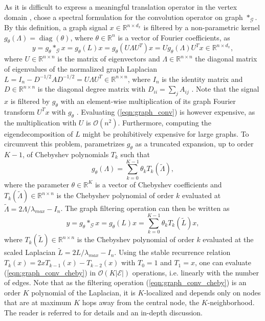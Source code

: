 \documentclass{article} %
\DeclareMathOperator*{\diag}{diag}
\newcommand{\R}{\mathbb{R}}
\newcommand{\bO}{\mathcal{O}}
\newcommand{\G}{\mathcal{G}}
\newcommand{\E}{\mathcal{E}}
\newcommand{\eqnref}[1]{(\ref{eqn:#1})}
\begin{document}
As it is difficult to express a meaningful translation operator in the vertex
domain \citep{gcnn_bruna, gcnn_niepert}, \citet{gcnn} chose a spectral
formulation for the convolution operator on graph $\ast_\G$. By this
definition, a graph signal $x \in \R^{n \times d_x}$ is filtered by a non-parametric kernel
$g_\theta(\Lambda) = \diag(\theta)$, where $\theta \in \R^n$ is a vector of
Fourier coefficients, as
\begin{equation} \label{eqn:graph_conv}
	y = g_\theta \ast_\G x = g_\theta(L) x =
	g_\theta(U \Lambda U^T) x = U g_\theta(\Lambda) U^T x \in \R^{n \times d_x},
\end{equation}
where $U \in \R^{n \times n}$ is the matrix of eigenvectors and $\Lambda \in
\R^{n \times n}$ the diagonal matrix of eigenvalues of the normalized graph
Laplacian $L = I_n - D^{-1/2} A D^{-1/2} = U \Lambda U^T \in \R^{n \times n}$,
where $I_n$ is the identity matrix and $D \in \R^{n \times n}$ is the diagonal
degree matrix with $D_{ii} = \sum_j A_{ij}$ \citep{chung}.  Note that the
signal $x$ is filtered by $g_\theta$ with an element-wise multiplication of its
graph Fourier transform $U^T x$ with $g_\theta$ \citep{gsp}. Evaluating
\eqnref{graph_conv} is however expensive, as the multiplication with $U$ is
$\bO(n^2)$. Furthermore, computing the eigendecomposition of $L$ might be
prohibitively expensive for large graphs. To circumvent this problem,
\cite{gcnn} parametrizes $g_\theta$ as a truncated expansion, up to order
$K-1$, of Chebyshev polynomials $T_k$ such that
\begin{equation} \label{eqn:filt_cheby}
	g_\theta(\Lambda) = \sum_{k=0}^{K-1} \theta_k T_k(\tilde{\Lambda}),
\end{equation}
where the parameter $\theta \in \R^K$ is a vector of Chebyshev coefficients and
$T_k(\tilde{\Lambda}) \in \R^{n \times n}$ is the Chebyshev polynomial of order
$k$ evaluated at $\tilde{\Lambda} = 2 \Lambda / \lambda_{max} - I_n$. The
graph filtering operation can then be written as
\begin{equation} \label{eqn:graph_conv_cheby}
	y = g_\theta \ast_\G x = g_\theta(L) x = \sum_{k=0}^{K-1} \theta_k T_k(\tilde{L}) x,
\end{equation}
where $T_k(\tilde{L}) \in \R^{n \times n}$ is the Chebyshev polynomial of order
$k$ evaluated at the scaled Laplacian $\tilde{L} = 2 L / \lambda_{max} - I_n$.
Using the stable recurrence relation $T_k(x) = 2x T_{k-1}(x) - T_{k-2}(x)$ with
$T_0 = 1$ and $T_1 = x$, one can evaluate \eqnref{graph_conv_cheby} in
$\bO(K|\E|)$ operations, i.e. linearly with the number of edges. Note that as
the filtering operation \eqnref{graph_conv_cheby} is an order $K$ polynomial of
the Laplacian, it is $K$-localized and depends only on nodes that are at
maximum $K$ hops away from the central node, the $K$-neighborhood. The reader
is referred to \cite{gcnn} for details and an in-depth discussion.
\end{document}
